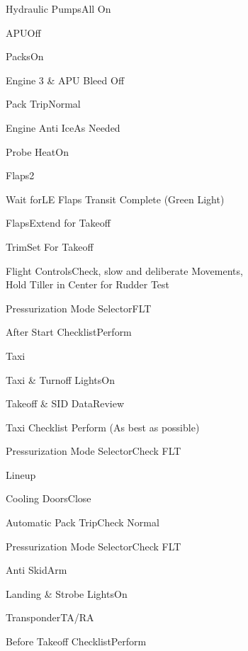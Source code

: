 \documentclass[sim-use]{checklist}
\begin{document}
\begin{continuedchecklist}
    \item{Hydraulic Pumps}{All On}
    \item{APU}{Off}
    \item{Packs}{On}
    \item{Engine 3 \& APU Bleed} {Off}
    \item{Pack Trip}{Normal}
    \item{Engine Anti Ice}{As Needed}
    \item{Probe Heat}{On}
    \item{Flaps}{2}
    \item{Wait for}{LE Flaps Transit Complete (Green Light)}
    \item{Flaps}{Extend for Takeoff}
    \item{Trim}{Set For Takeoff}
    \item{Flight Controls}{Check, slow and deliberate Movements,\\Hold Tiller in Center for Rudder Test}
    \item{Pressurization Mode Selector}{FLT}
    \item{After Start Checklist}{Perform}
\end{continuedchecklist}

\begin{checklist}{Taxi}
    \item{Taxi \& Turnoff Lights}{On}
    \item{Takeoff \& SID Data}{Review}
    \item{Taxi Checklist} {Perform (As best as possible)}
    \item{Pressurization Mode Selector}{Check FLT}
\end{checklist}

\begin{checklist}{Lineup}
     {
        \item{Cooling Doors}{Close}
    }
    \item{Automatic Pack Trip}{Check Normal}
    \item{Pressurization Mode Selector}{Check FLT}
    \item{Anti Skid}{Arm}
    \item{Landing \& Strobe Lights}{On}
    \item{Transponder}{TA/RA}
    \item{Before Takeoff Checklist}{Perform}
\end{checklist}
\end{document}

